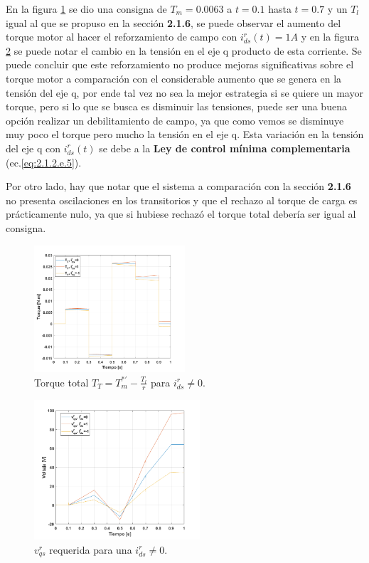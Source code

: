 \documentclass[10pt]{article}
\begin{document}
\begin{itemize}
	En la figura \ref{fig:TTmodulador_id} se dio una consigna de $T_{m}=0.0063$ a $t=0.1$ hasta $t=0.7$ y un $T_{l}$ igual al que se propuso en la sección \textbf{2.1.6}, se puede observar el aumento del torque motor al hacer el reforzamiento de campo con $i^{r}_{ds}(t)=1 A$ y en la figura \ref{fig:vqmodulador_id} se puede notar el cambio en la tensión en el eje q producto de esta corriente.
	Se puede concluir que este reforzamiento no produce mejoras significativas sobre el torque motor a comparación con el considerable aumento que se genera en la tensión del eje q, por ende tal vez no sea la mejor estrategia si se quiere un mayor torque, pero si lo que se busca es disminuir las tensiones, puede ser una buena opción realizar un debilitamiento de campo, ya que como vemos se disminuye muy poco el torque pero mucho la tensión en el eje q.
	Esta variación en la tensión del eje q con $i^{r}_{ds}(t)$  se debe a la \textbf{Ley de control mínima complementaria} (ec.\ref{eq:2.1.2.e.5}).
	
	Por otro lado, hay que notar que el sistema a comparación con la sección \textbf{2.1.6} no presenta oscilaciones en los transitorios y que el rechazo al torque de carga es prácticamente nulo, ya que si hubiese rechazó el torque total debería ser igual al consigna. 
	 	\begin{figure}[h!]
	\centering
	\includegraphics[width=0.5\textwidth]{TTmodulador_id.png}
	\caption{\label{fig:TTmodulador_id}Torque total $T_{T}=T^{*'}_{m}-\frac{T_{l}}{r}$ para $i^{r}_{ds}\neq0$.}
	\end{figure}
		 	\begin{figure}[h!]
	\centering
	\includegraphics[width=0.55\textwidth]{Tmodulador_id.png}
	\caption{\label{fig:vqmodulador_id}$v^{r}_{qs}$ requerida para una $i^{r}_{ds}\neq0$.}
	\end{figure}
\end{itemize}
\end{document}
